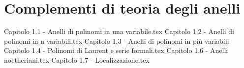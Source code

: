 \documentclass{article}
\begin{document}
\section{Complementi di teoria degli anelli}
{Capitolo 1.1 - Anelli di polinomi in una variabile.tex}
{Capitolo 1.2 - Anelli di polinomi in n variabili.tex}
{Capitolo 1.3 - Anelli di polinomi in più variabili}
{Capitolo 1.4 - Polinomi di Laurent e serie formali.tex}
{Capitolo 1.6 - Anelli noetheriani.tex}
{Capitolo 1.7 - Localizzazione.tex}
\end{document}
